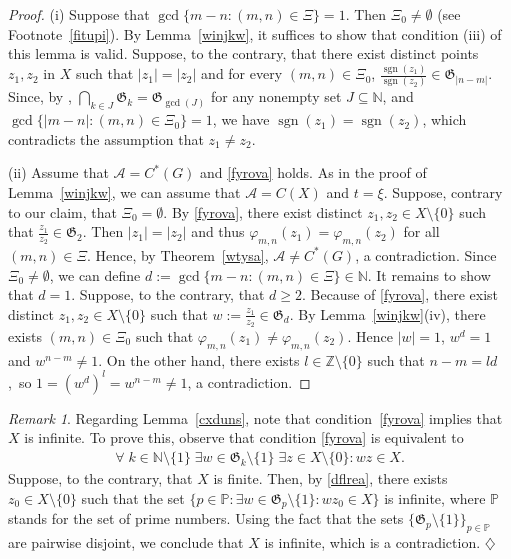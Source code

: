 \documentclass[reqno]{amsproc}
\DeclareMathOperator{\sgn}{sgn}
\numberwithin{equation}{section}
\theoremstyle{remark}
\newtheorem{rem}[theorem]{Remark}
\newcommand*{\ascr}{\mathscr{A}}
\newcommand*{\natu}{\mathbb{N}}
\theoremstyle{definition}
\newcommand*{\Ge}{\geqslant}
\newcommand*{\zbb}{\mathbb{Z}}
\begin{document}
   \begin{proof}
(i) Suppose that $\gcd\{m-n\colon (m,n)\in
\varXi\}=1$. Then $\varXi_0\neq \emptyset$ (see
Footnote~\ref{fitupi}). By Lemma~\ref{winjkw}, it
suffices to show that condition (iii) of this lemma is
valid. Suppose, to the contrary, that there exist
distinct points $z_1,z_2$ in $X$ such that
$|z_1|=|z_2|$ and for every $(m,n)\in \varXi_0$,
$\frac{\sgn(z_1)}{\sgn(z_2)} \in
\mathfrak{G}_{|n-m|}$. Since, by
\cite[Lemma~3.1]{St-St17}, $\bigcap_{k \in J}
\mathfrak{G}_{k} = \mathfrak{G}_{\gcd(J)}$ for any
nonempty set $J \subseteq \natu$, and
$\gcd\{|m-n|\colon (m,n)\in \varXi_0\}=1$, we have
$\sgn(z_1)=\sgn(z_2)$, which contradicts the
assumption that $z_1\neq z_2$.

(ii) Assume that $\ascr=C^*(G)$ and \eqref{fyrova}
holds. As in the proof of Lemma~\ref{winjkw}, we can
assume that $\ascr=C(X)$ and $t=\xi$. Suppose,
contrary to our claim, that $\varXi_0 = \emptyset$. By
\eqref{fyrova}, there exist distinct $z_1,z_2\in
X\setminus \{0\}$ such that $\frac{z_1}{z_2} \in
\mathfrak{G}_2$. Then $|z_1|=|z_2|$ and thus
$\varphi_{m,n}(z_1) = \varphi_{m,n}(z_2)$ for all
$(m,n)\in \varXi$. Hence, by Theorem~\ref{wtysa},
$\ascr\neq C^*(G)$, a contradiction. Since
$\varXi_0\neq \emptyset$, we can define
$d:=\gcd\{m-n\colon (m,n)\in \varXi\} \in \natu$. It
remains to show that $d=1$. Suppose, to the contrary,
that $d \Ge 2$. Because of \eqref{fyrova}, there exist
distinct $z_1,z_2\in X\setminus \{0\}$ such that
$w:=\frac{z_1}{z_2} \in \mathfrak{G}_d$. By
Lemma~\ref{winjkw}(iv), there exists $(m,n)\in
\varXi_0$ such that $\varphi_{m,n}(z_1) \neq
\varphi_{m,n}(z_2)$. Hence $|w|=1$, $w^d=1$ and
$w^{n-m} \neq 1$. On the other hand, there exists
$l\in \zbb \setminus \{0\}$ such that $n-m=ld$,~so
$1=(w^{d})^l=w^{n-m}\neq 1$, a contradiction.
   \end{proof}
   \begin{rem}
Regarding Lemma~\ref{cxduns}, note that
condition~\eqref{fyrova} implies that $X$ is infinite.
To prove this, observe that condition \eqref{fyrova}
is equivalent to
   \begin{align} \label{dflrea}
\forall \; k\in \natu \setminus \{1\} \; \exists w\in
\mathfrak{G}_k\setminus \{1\}\; \exists z\in
X\setminus \{0\} \colon wz\in X.
   \end{align}
Suppose, to the contrary, that $X$ is finite. Then, by
\eqref{dflrea}, there exists $z_0 \in X \setminus
\{0\}$ such that the set $\{p\in \mathbb{P}\colon
\exists w\in \mathfrak{G}_p\setminus \{1\} \colon wz_0
\in X\}$ is infinite, where $\mathbb{P}$ stands for
the set of prime numbers. Using the fact that the sets
$\{\mathfrak{G}_p\setminus \{1\}\}_{p\in \mathbb{P}}$
are pairwise disjoint, we conclude that $X$ is
infinite, which is a contradiction. \hfill
$\diamondsuit$
   \end{rem}
\end{document}
